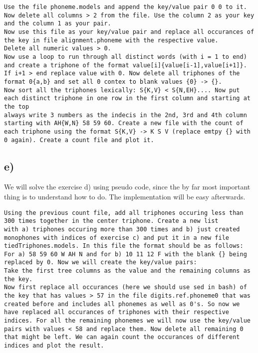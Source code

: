 \begin{lstlisting}
Use the file phoneme.models and append the key/value pair 0 0 to it. Now delete all columns > 2 from the file. Use the column 2 as your key and the column 1 as your pair. 
Now use this file as your key/value pair and replace all occurances of the key in file alignment.phoneme with the respective value.
Delete all numeric values > 0. 
Now use a loop to run through all distinct words (with i = 1 to end) and create a triphone of the format value[i]{value[i-1],value[i+1]}. 
If i+1 > end replace value with 0. Now delete all triphones of the format 0{a,b} and set all 0 contex to blank values {0} -> {}.
Now sort all the triphones lexically: S{K,V} < S{N,EH}.... Now put each distinct triphone in one row in the first column and starting at the top 
always write 3 numbers as the indecis in the 2nd, 3rd and 4th column starting with AH{W,N} 58 59 60. Create a new file with the count of each triphone using the format S{K,V} -> K S V (replace emtpy {} with 0 again). Create a count file and plot it.
\end{lstlisting}


\subsection*{e)} %
\label{sub:e_}

We will solve the exercise d) using pseudo code, since the by far most important thing is to understand how to do.
The implementation will be easy afterwards.

\begin{lstlisting}
Using the previous count file, add all triphones occuring less than 300 times together in the center triphone. Create a new list 
with a) triphones occuring more than 300 times and b) just created monophones with indices of exercise c) and put it in a new file 
tiedTriphones.models. In this file the format should be as follows: For a) 58 59 60 W AH N and for b) 10 11 12 F with the blank {} being replaced by 0. Now we will create the key/value pairs: 
Take the first tree columns as the value and the remaining columns as the key. 
Now first replace all occurances (here we should use sed in bash) of the key that has values > 57 in the file digits.ref.phoneme0 that was created before and includes all phonemes as well as 0's. So now we have replaced all occurances of triphones with their respective indices. For all the remaining phonemes we will now use the key/value pairs with values < 58 and replace them. Now delete all remaining 0 that might be left. We can again count the occurances of different indices and plot the result.
\end{lstlisting}


